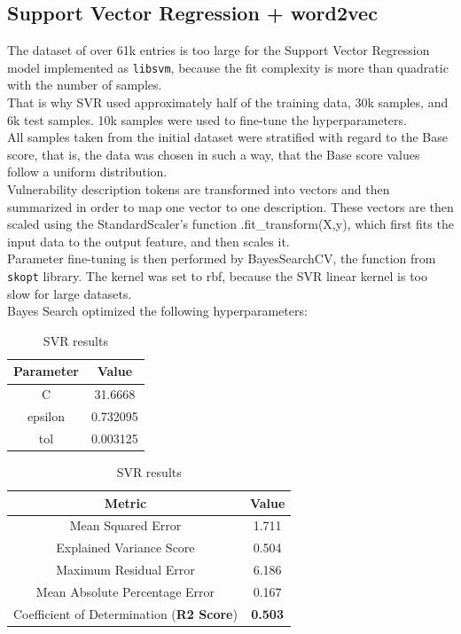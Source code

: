 \documentclass[times, utf8, zavrsni, english]{fer}
\begin{document}
\subsection{Support Vector Regression + word2vec}
The dataset of over 61k entries is too large for the Support Vector Regression model implemented as \texttt{libsvm}, because the fit complexity is more than quadratic with the number of samples.\\
That is why SVR used approximately half of the training data, 30k samples, and 6k test samples. 
10k samples were used to fine-tune the hyperparameters. \\
All samples taken from the initial dataset were stratified with regard to the Base score, that is, the data was chosen in such a way, that the Base score values follow a uniform distribution.\\
Vulnerability description tokens are transformed into vectors and then summarized in order to map one vector to one description.
These vectors are then scaled using the StandardScaler's function .fit\_transform(X,y), which first fits the input data to the output feature, and then scales it.\\
Parameter fine-tuning is then performed by BayesSearchCV, the function from \texttt{skopt} library. The kernel was set to rbf, because the SVR linear kernel is too slow for large datasets.\\
Bayes Search optimized the following hyperparameters:
\begin{table}[h!]
	\parbox{.45\linewidth}{
	\centering
	
	\begin{tabular}{|| c | c ||} 
		\hline
		Parameter & Value \\ [0.5ex] 
		\hline\hline
		C & 31.6668  \\ \hline
		epsilon & 0.732095 \\ \hline
		tol & 0.003125  \\ 
		\hline
	\end{tabular}
	\caption{Hyperparameteres for SVR}
	\label{table:3}
}
	\parbox{.45\linewidth}{
	\centering
	\begin{tabular}{|| c | c ||} 
		\hline
		Metric & Value \\ [0.5ex] 
		\hline\hline
		Mean Squared Error & 1.711  \\ \hline
		Explained Variance Score & 0.504\\ \hline
		Maximum Residual Error & 6.186 \\ \hline
		Mean Absolute Percentage Error & 0.167 \\ \hline
		Coefficient of Determination (\textbf{R2 Score}) & \textbf{0.503} \\
		\hline
	\end{tabular}
	\caption{SVR results}
	\label{table:4}
}
\end{table}
\end{document}
